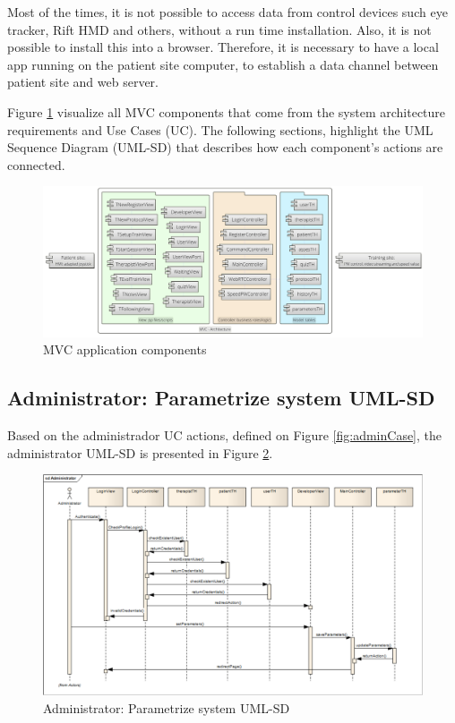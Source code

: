 Most of the times, it is not possible to access data from control devices such eye tracker, Rift HMD and others, without a run time installation. Also, it is not possible to install this into a browser. Therefore, it is necessary to have a local app running on the patient site computer, to establish a data channel between patient site and web server.


Figure \ref{fig:mvc-layersArch} visualize all MVC components that come from the system architecture requirements and Use Cases (UC). The following sections, highlight the UML Sequence Diagram (UML-SD) that describes how each component's actions are connected.

\begin{figure}[!hbt]
\begin{center}
\includegraphics[width=1\linewidth]{img/cap4/mvc-layersArch}
\caption{MVC application components} \label{fig:mvc-layersArch}
\end{center}
\end{figure}

\subsection{Administrator: Parametrize system UML-SD}

Based on the administrador UC actions, defined on Figure \ref{fig:adminCase},  the administrator UML-SD is presented in Figure \ref{fig:UMLSD-Administrator}.


\begin{figure}[!hbt]
\begin{center}
\includegraphics[width=1 \textwidth]{img/cap4/UMLSD-Administrator}
\caption{Administrator: Parametrize system UML-SD}
\label{fig:UMLSD-Administrator}
\end{center}
\end{figure} 

